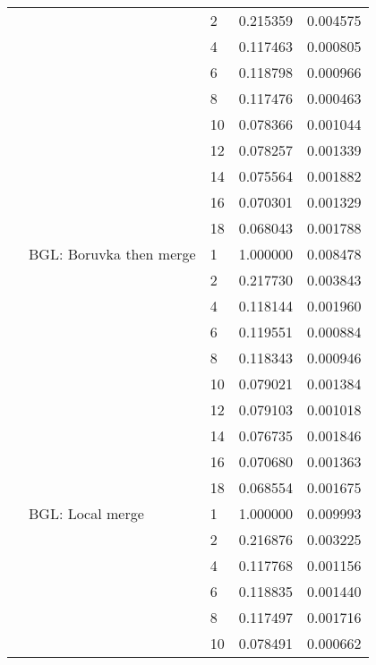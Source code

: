 \begin{tabular}{lllrr}
                      &            & 2  &  0.215359 &  0.004575 \\
                      &            & 4  &  0.117463 &  0.000805 \\
                      &            & 6  &  0.118798 &  0.000966 \\
                      &            & 8  &  0.117476 &  0.000463 \\
                      &            & 10 &  0.078366 &  0.001044 \\
                      &            & 12 &  0.078257 &  0.001339 \\
                      &            & 14 &  0.075564 &  0.001882 \\
                      &            & 16 &  0.070301 &  0.001329 \\
                      &            & 18 &  0.068043 &  0.001788 \\
                      & BGL: Boruvka then merge & 1  &  1.000000 &  0.008478 \\
                      &            & 2  &  0.217730 &  0.003843 \\
                      &            & 4  &  0.118144 &  0.001960 \\
                      &            & 6  &  0.119551 &  0.000884 \\
                      &            & 8  &  0.118343 &  0.000946 \\
                      &            & 10 &  0.079021 &  0.001384 \\
                      &            & 12 &  0.079103 &  0.001018 \\
                      &            & 14 &  0.076735 &  0.001846 \\
                      &            & 16 &  0.070680 &  0.001363 \\
                      &            & 18 &  0.068554 &  0.001675 \\
                      & BGL: Local merge & 1  &  1.000000 &  0.009993 \\
                      &            & 2  &  0.216876 &  0.003225 \\
                      &            & 4  &  0.117768 &  0.001156 \\
                      &            & 6  &  0.118835 &  0.001440 \\
                      &            & 8  &  0.117497 &  0.001716 \\
                      &            & 10 &  0.078491 &  0.000662 \\

\end{tabular}
